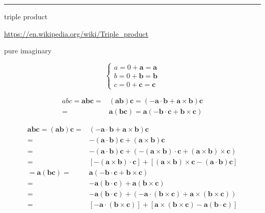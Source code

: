 \documentclass[
]{book}
\theoremstyle{definition}
\theoremstyle{definition}
\theoremstyle{definition}
\theoremstyle{definition}
\theoremstyle{remark}
\begin{document}
\begin{center}\rule{0.5\linewidth}{0.5pt}\end{center}

triple product

\url{https://en.wikipedia.org/wiki/Triple_product}

pure imaginary

\[
\begin{cases}
a=0+\boldsymbol{a}=\boldsymbol{a}\\
b=0+\boldsymbol{b}=\boldsymbol{b}\\
c=0+\boldsymbol{c}=\boldsymbol{c}
\end{cases}
\]

\[
\begin{aligned}
abc=\boldsymbol{a}\boldsymbol{b}\boldsymbol{c}= & \left(\boldsymbol{a}\boldsymbol{b}\right)\boldsymbol{c}=\left(-\boldsymbol{a}\cdot\boldsymbol{b}+\boldsymbol{a}\times\boldsymbol{b}\right)\boldsymbol{c}\\
= & \boldsymbol{a}\left(\boldsymbol{b}\boldsymbol{c}\right)=\boldsymbol{a}\left(-\boldsymbol{b}\cdot\boldsymbol{c}+\boldsymbol{b}\times\boldsymbol{c}\right)
\end{aligned}
\]

\[
\begin{aligned}
\boldsymbol{a}\boldsymbol{b}\boldsymbol{c}=\left(\boldsymbol{a}\boldsymbol{b}\right)\boldsymbol{c}= & \left(-\boldsymbol{a}\cdot\boldsymbol{b}+\boldsymbol{a}\times\boldsymbol{b}\right)\boldsymbol{c}\\
= & -\left(\boldsymbol{a}\cdot\boldsymbol{b}\right)\boldsymbol{c}+\left(\boldsymbol{a}\times\boldsymbol{b}\right)\boldsymbol{c}\\
= & -\left(\boldsymbol{a}\cdot\boldsymbol{b}\right)\boldsymbol{c}+\left(-\left(\boldsymbol{a}\times\boldsymbol{b}\right)\cdot\boldsymbol{c}+\left(\boldsymbol{a}\times\boldsymbol{b}\right)\times\boldsymbol{c}\right)\\
= & \left[-\left(\boldsymbol{a}\times\boldsymbol{b}\right)\cdot\boldsymbol{c}\right]+\left[\left(\boldsymbol{a}\times\boldsymbol{b}\right)\times\boldsymbol{c}-\left(\boldsymbol{a}\cdot\boldsymbol{b}\right)\boldsymbol{c}\right]\\
=\boldsymbol{a}\left(\boldsymbol{b}\boldsymbol{c}\right)= & \boldsymbol{a}\left(-\boldsymbol{b}\cdot\boldsymbol{c}+\boldsymbol{b}\times\boldsymbol{c}\right)\\
= & -\boldsymbol{a}\left(\boldsymbol{b}\cdot\boldsymbol{c}\right)+\boldsymbol{a}\left(\boldsymbol{b}\times\boldsymbol{c}\right)\\
= & -\boldsymbol{a}\left(\boldsymbol{b}\cdot\boldsymbol{c}\right)+\left(-\boldsymbol{a}\cdot\left(\boldsymbol{b}\times\boldsymbol{c}\right)+\boldsymbol{a}\times\left(\boldsymbol{b}\times\boldsymbol{c}\right)\right)\\
= & \left[-\boldsymbol{a}\cdot\left(\boldsymbol{b}\times\boldsymbol{c}\right)\right]+\left[\boldsymbol{a}\times\left(\boldsymbol{b}\times\boldsymbol{c}\right)-\boldsymbol{a}\left(\boldsymbol{b}\cdot\boldsymbol{c}\right)\right]
\end{aligned}
\]
\end{document}
